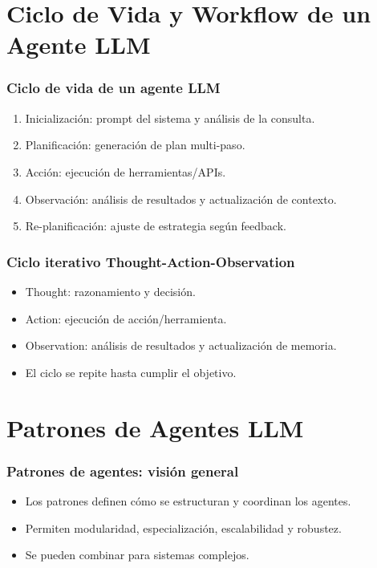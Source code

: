 \documentclass[aspectratio=169,xcolor=dvipsnames, t]{beamer}
\begin{document}
\section{Ciclo de Vida y Workflow de un Agente LLM}

\begin{frame}
\frametitle{Ciclo de vida de un agente LLM}
\begin{enumerate}
    \item Inicialización: prompt del sistema y análisis de la consulta.
    \item Planificación: generación de plan multi-paso.
    \item Acción: ejecución de herramientas/APIs.
    \item Observación: análisis de resultados y actualización de contexto.
    \item Re-planificación: ajuste de estrategia según feedback.
\end{enumerate}
\end{frame}

\begin{frame}
\frametitle{Ciclo iterativo Thought-Action-Observation}
\begin{itemize}
    \item Thought: razonamiento y decisión.
    \item Action: ejecución de acción/herramienta.
    \item Observation: análisis de resultados y actualización de memoria.
    \item El ciclo se repite hasta cumplir el objetivo.
\end{itemize}
\end{frame}

\section{Patrones de Agentes LLM}

\begin{frame}
\frametitle{Patrones de agentes: visión general}
\begin{itemize}
    \item Los patrones definen cómo se estructuran y coordinan los agentes.
    \item Permiten modularidad, especialización, escalabilidad y robustez.
    \item Se pueden combinar para sistemas complejos.
\end{itemize}
\end{frame}
\end{document}
